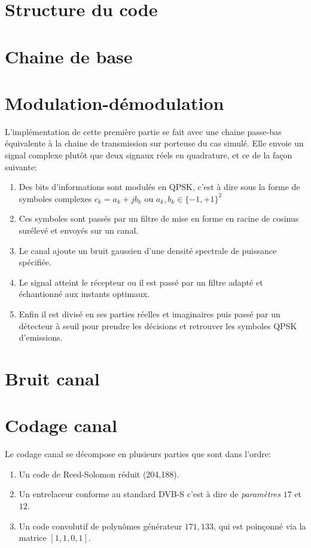 \documentclass[a4paper,11pt]{article}
\begin{document}
\section{Structure du code}

\section{Chaine de base}



\section{Modulation-démodulation}
L'implémentation de cette première partie se fait avec une chaine passe-bas équivalente à la chaine de transmission sur porteuse du cas simulé. Elle envoie un signal complexe plutôt que deux signaux réels en quadrature, et ce de la façon suivante:
\begin{enumerate}
	\item Des bits d'informations sont modulés en QPSK, c'est à dire sous la forme de symboles complexes $c_k=a_k+jb_k$ ou $a_k,b_k \in \{-1,+1\}^2$
	\item Ces symboles sont passés par un filtre de mise en forme en racine de cosinus surélevé et envoyés sur un canal.
	\item Le canal ajoute un bruit gaussien d'une densité spectrale de puissance spécifiée.
	\item Le signal atteint le récepteur ou il est passé par un filtre adapté et échantionné aux instants optimaux.
	\item Enfin il est divisé en ses parties réelles et imaginaires puis passé par un détecteur à seuil pour prendre les décisions et retrouver les symboles QPSK d'emissions.
\end{enumerate}


\section{Bruit canal}

\section{Codage canal}
Le codage canal se décompose en plusieurs parties que sont dans l'ordre:
\begin{enumerate}
	\item Un code de Reed-Solomon réduit (204,188).
	\item Un entrelaceur conforme au standard DVB-S c'est à dire de \emph{paramètres} $17$ et $12$.
	\item Un code convolutif de polynômes générateur $171, 133$, qui est poinçonné via la matrice $[1,1,0,1]$.
\end{enumerate}
\end{document}
